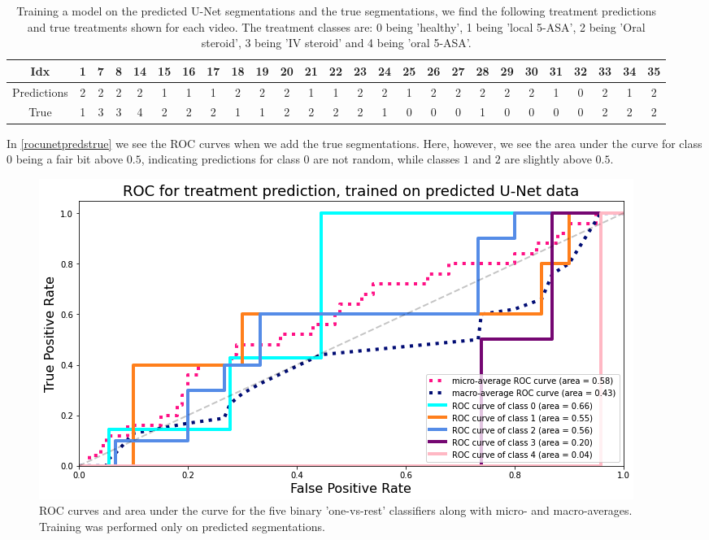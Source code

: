 \begin{table}[H]
	\hspace{-2.7cm}
	\begin{tabular}{|c|c|c|c|c|c|c|c|c|c|c|c|c|c|c|c|c|c|c|c|c|c|c|c|c|c|}
		\hline
		Idx&1
		&7
		&8
		&14
		&15
		&16
		&17
		&18
		&19
		&20
		&21
		&22
		&23
		&24
		&25
		&26
		&27
		&28
		&29
		&30
		&31
		&32
		&33
		&34
		&35\\\hline\hline
		Predictions&2
		&2
		&2
		&2
		&1
		&1
		&1
		&2
		&2
		&2
		&1
		&1
		&2
		&2
		&1
		&2
		&2
		&2
		&2
		&2
		&1
		&0
		&2
		&1
		&2\\\hline
		True&1
		&3
		&3
		&4
		&2
		&2
		&2
		&1
		&1
		&2
		&2
		&2
		&2
		&1
		&0
		&0
		&0
		&1
		&0
		&0
		&0
		&0
		&2
		&2
		&2\\\hline
	\end{tabular}
	\caption{Training a model on the predicted U-Net segmentations and the true segmentations, we find the following treatment predictions and true treatments shown for each video. The treatment classes are: 0 being 'healthy', 1 being 'local 5-ASA', 2 being 'Oral steroid', 3 being 'IV steroid' and 4 being 'oral 5-ASA'.}
	\label{unetPredsTrueTreatmentTable}
\end{table}

In \autoref{rocunetpredstrue} we see the ROC curves when we add the true segmentations. Here, however, we see the area under the curve for class $0$ being a fair bit above $0.5$, indicating predictions for class $0$ are not random, while classes $1$ and $2$ are slightly above $0.5$. 

\begin{figure}[H]
	\centering
	\includegraphics[width=0.85\linewidth]{Materials/Results/UNet/UNetROC2}
	\caption{ROC curves and area under the curve for the five binary 'one-vs-rest' classifiers along with micro- and macro-averages. Training was performed only on predicted segmentations.}
	\label{rocunetpredstrue}
\end{figure}
